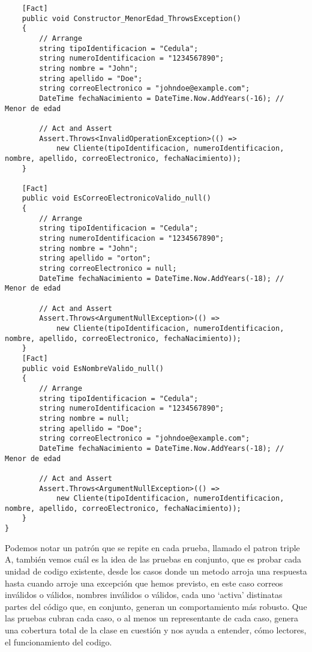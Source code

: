 \documentclass[executivepaper]{article}
\begin{document}
\begin{lstlisting}
    [Fact]
    public void Constructor_MenorEdad_ThrowsException()
    {
        // Arrange
        string tipoIdentificacion = "Cedula";
        string numeroIdentificacion = "1234567890";
        string nombre = "John";
        string apellido = "Doe";
        string correoElectronico = "johndoe@example.com";
        DateTime fechaNacimiento = DateTime.Now.AddYears(-16); // Menor de edad

        // Act and Assert
        Assert.Throws<InvalidOperationException>(() =>
            new Cliente(tipoIdentificacion, numeroIdentificacion, nombre, apellido, correoElectronico, fechaNacimiento));
    }

    [Fact]
    public void EsCorreoElectronicoValido_null()
    {
        // Arrange
        string tipoIdentificacion = "Cedula";
        string numeroIdentificacion = "1234567890";
        string nombre = "John";
        string apellido = "orton";
        string correoElectronico = null;
        DateTime fechaNacimiento = DateTime.Now.AddYears(-18); // Menor de edad

        // Act and Assert
        Assert.Throws<ArgumentNullException>(() =>
            new Cliente(tipoIdentificacion, numeroIdentificacion, nombre, apellido, correoElectronico, fechaNacimiento));
    }
    [Fact]
    public void EsNombreValido_null()
    {
        // Arrange
        string tipoIdentificacion = "Cedula";
        string numeroIdentificacion = "1234567890";
        string nombre = null;
        string apellido = "Doe";
        string correoElectronico = "johndoe@example.com";
        DateTime fechaNacimiento = DateTime.Now.AddYears(-18); // Menor de edad

        // Act and Assert
        Assert.Throws<ArgumentNullException>(() =>
            new Cliente(tipoIdentificacion, numeroIdentificacion, nombre, apellido, correoElectronico, fechaNacimiento));
    }
}
\end{lstlisting}

Podemos notar un patrón que se repite en cada prueba, llamado el patron triple A, también vemos cuál es la idea de las pruebas en conjunto, que es probar cada unidad de codigo existente, desde los casos donde un metodo arroja una respuesta hasta cuando arroje una excepción que hemos previsto, en este caso correos inválidos o válidos, nombres inválidos o válidos, cada uno \enquote*{activa} distinatas partes del código que, en conjunto, generan un comportamiento más robusto. Que las pruebas cubran cada caso, o al menos un representante de cada caso, genera una cobertura total de la clase en cuestión y nos ayuda a entender, cómo lectores, el funcionamiento del codigo.
\end{document}
